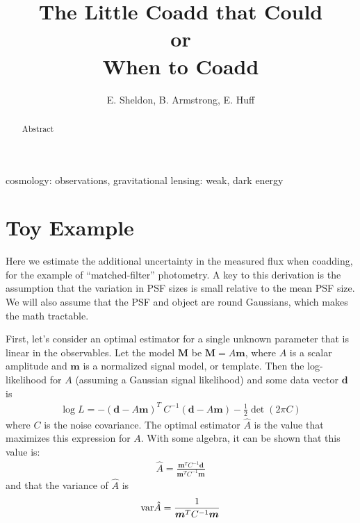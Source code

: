\documentclass[a4paper,fleqn,usenatbib,referee]{mnras}
\title{The Little Coadd that Could\\
or\\
When to Coadd}
\author[E. Sheldon, B. Armstrong, E. Huff]{E. Sheldon, B. Armstrong, E. Huff}
\begin{document}
\maketitle

\begin{abstract}

    Abstract

\end{abstract}


\begin{keywords}                                                                    
    cosmology: observations,
    gravitational lensing: weak,
    dark energy
\end{keywords} 

\section{Toy Example} \label{sec:toy}

Here we estimate the additional uncertainty in the measured flux when coadding,
for the example of ``matched-filter'' photometry.  A key to this derivation is
the assumption that the variation in PSF sizes is small relative to the mean
PSF size.  We will also assume that the PSF and object are round Gaussians,
which makes the math tractable.

First, let's consider an optimal estimator for a single unknown parameter that
is linear in the observables. Let the model $\boldsymbol{M}$ be $\boldsymbol{M}
= A\boldsymbol{m}$, where $A$ is a scalar amplitude and $\boldsymbol{m}$ is a
normalized signal model, or template. Then the log-likelihood for $A$ (assuming
a Gaussian signal likelihood) and some data vector $\boldsymbol{d}$ is
\begin{align}
  \log L = - (\boldsymbol{d} - A\boldsymbol{m})^T\: C^{-1} (\boldsymbol{d} - A\boldsymbol{m}) - \frac{1}{2} \det(2\pi C )
\end{align}
where $C$ is the noise covariance. The optimal estimator $\hat{A}$ is the value
that maximizes this expression for $A$. With some algebra, it can be shown that
this value is:
\begin{align}
\hat{A} = \frac{\boldsymbol{m}^T C^{-1} \boldsymbol{d}}{\boldsymbol{m}^T C^{-1} \boldsymbol{m}}
\end{align}
and that the variance of $\hat{A}$ is
\begin{align}
{\rm var}\hat{A} = \frac{1}{{\boldsymbol{m}^T C^{-1} \boldsymbol{m}}}
\end{align}
\end{document}

